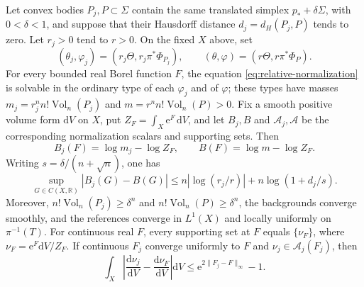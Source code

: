 \begin{theorem}\label{thm:convex-body-reference-stability}
Let convex bodies $P_j,P\subset\Sigma$ contain the same translated simplex $p_*+\delta\Sigma$, with $0<\delta<1$, and suppose that their Hausdorff distance $d_j=d_H(P_j,P)$ tends to zero. Let $r_j>0$ tend to $r>0$. On the fixed $X$ above, set
\[
 (\theta_j,\varphi_j)=(r_j\Theta,r_j\pi^*\Phi_{P_j}),
 \qquad (\theta,\varphi)=(r\Theta,r\pi^*\Phi_P).
\]
For every bounded real Borel function $F$, the equation \eqref{eq:relative-normalization} is solvable in the ordinary type of each $\varphi_j$ and of $\varphi$; these types have masses $m_j=r_j^n n!\operatorname{Vol}_n(P_j)$ and $m=r^n n!\operatorname{Vol}_n(P)>0$. Fix a smooth positive volume form $\mathrm{d}V$ on $X$, put $Z_F=\int_X\mathrm{e}^F\,\mathrm{d}V$, and let $B_j,B$ and $\mathcal A_j,\mathcal A$ be the corresponding normalization scalars and supporting sets. Then
\[
 B_j(F)=\log m_j-\log Z_F,\qquad B(F)=\log m-\log Z_F.
\]
Writing $s=\delta/(n+\sqrt n)$, one has
\begin{equation}\label{eq:convex-body-functional-bound}
 \sup_{G\in C(X,\mathbb R)}|B_j(G)-B(G)|
 \leq n|\log(r_j/r)|+n\log(1+d_j/s).
\end{equation}
Moreover, $n!\operatorname{Vol}_n(P_j)\geq\delta^n$ and $n!\operatorname{Vol}_n(P)\geq\delta^n$, the backgrounds converge smoothly, and the references converge in $L^1(X)$ and locally uniformly on $\pi^{-1}(T)$. For continuous real $F$, every supporting set at $F$ equals $\{\nu_F\}$, where $\nu_F=\mathrm{e}^F\mathrm{d}V/Z_F$. If continuous $F_j$ converge uniformly to $F$ and $\nu_j\in\mathcal A_j(F_j)$, then
\begin{equation}\label{eq:convex-body-support-bound}
 \int_X\left|\frac{\mathrm{d}\nu_j}{\mathrm{d}V}
          -\frac{\mathrm{d}\nu_F}{\mathrm{d}V}\right|\mathrm{d}V
 \leq\mathrm{e}^{2\|F_j-F\|_\infty}-1.
\end{equation}
\end{theorem}
